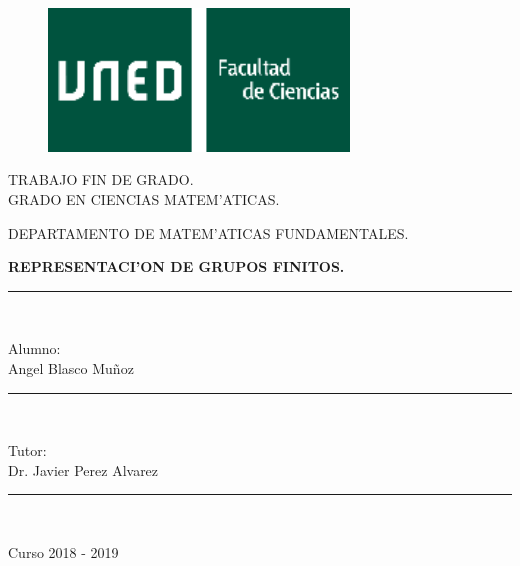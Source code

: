 \documentclass[a4paper,openright,12pt]{report}
\numberwithin{equation}{section} %
\begin{document}
\begin{titlepage}

\begin{center}
\vspace*{0.6in}
\begin{figure}[htb]
\begin{center}
\includegraphics[width=8cm]{./logo_uned.png}
\end{center}
\end{figure}

\begin{large}
TRABAJO FIN DE GRADO.\\
GRADO EN CIENCIAS MATEM'ATICAS.\\
\end{large}
\vspace*{0.15in}
DEPARTAMENTO DE MATEM'ATICAS FUNDAMENTALES. \\
\vspace*{0.4in}

\begin{Large}
\textbf{REPRESENTACI'ON DE GRUPOS FINITOS.} \\
\end{Large}
\vspace*{0.3in}

\rule{80mm}{0.1mm}\\
\vspace*{0.1in}
\begin{large}
Alumno: \\
Angel Blasco Mu\~noz \\
\end{large}

\rule{80mm}{0.1mm}\\
\vspace*{0.1in}
\begin{large}
Tutor:\\
Dr. Javier Perez Alvarez\\
\end{large}
\rule{80mm}{0.1mm}\\

\end{center}
\vspace*{1in}
\begin{flushright}
Curso 2018 - 2019
\end{flushright}
\end{titlepage}
\newpage
$\ $
\thispagestyle{empty}
%
\end{document}
